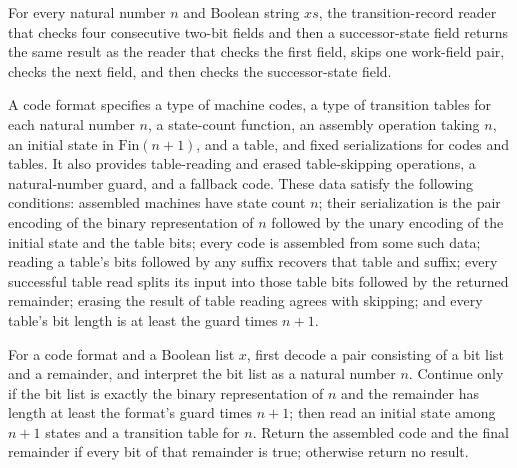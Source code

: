 \begin{lemma}
\label{Turing.codeSkipAction_eq_codeSkipActionK}
\leanok
{}
For every natural number $n$ and Boolean string $xs$, the transition-record reader that
checks four consecutive two-bit fields and then a successor-state field returns the same
result as the reader that checks the first field, skips one work-field pair, checks the
next field, and then checks the successor-state field.
\end{lemma}

\begin{definition}
\label{Turing.CodeFormat}
\leanok
{}
A code format specifies a type of machine codes, a type of transition tables for each
natural number $n$, a state-count function, an assembly operation taking $n$, an initial
state in $\text{Fin}(n+1)$, and a table, and fixed serializations for codes and tables.
It also provides table-reading and erased table-skipping operations, a natural-number
guard, and a fallback code. These data satisfy the following conditions: assembled
machines have state count $n$; their serialization is the pair encoding of the binary
representation of $n$ followed by the unary encoding of the initial state and the table
bits; every code is assembled from some such data; reading a table's bits followed by
any suffix recovers that table and suffix; every successful table read splits its input
into those table bits followed by the returned remainder; erasing the result of table
reading agrees with skipping; and every table's bit length is at least the guard times
$n+1$.
\end{definition}

\begin{definition}
\label{Turing.CodeFormat.parseFull}
\leanok
{}
For a code format and a Boolean list $x$, first decode a pair consisting of a bit list
and a remainder, and interpret the bit list as a natural number $n$. Continue only if
the bit list is exactly the binary representation of $n$ and the remainder has length at
least the format's guard times $n+1$; then read an initial state among $n+1$ states and
a transition table for $n$. Return the assembled code and the final remainder if every
bit of that remainder is true; otherwise return no result.
\end{definition}

